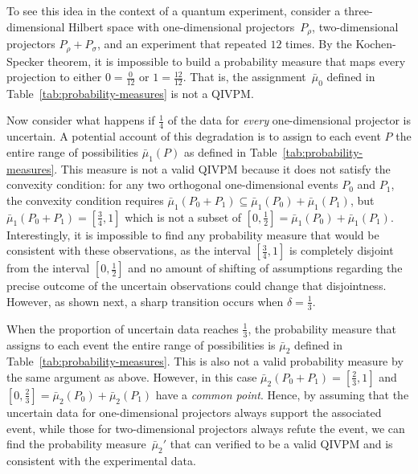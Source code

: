 \documentclass[english,reprint, aps, prl,superscriptaddress, showpacs,
showkeys, longbibliography, amsmath, amssymb, floatfix]{revtex4-1}
\theoremstyle{plain}
\theoremstyle{definition}
\begin{document}
To see this idea in the context of a quantum experiment, consider
a three-dimensional Hilbert space with one-dimensional projectors~$P_{\rho}$,
two-dimensional projectors $P_{\rho}+P_{\sigma}$, and an experiment
that repeated $12$ times. By the Kochen-Specker theorem, it is impossible
to build a probability measure that maps every projection to either
$0=\frac{0}{12}$ or $1=\frac{12}{12}$. That is, the assignment~$\bar{\mu}_{0}$
defined in Table~\ref{tab:probability-measures} is not a QIVPM.

Now consider what happens if $\frac{1}{4}$ of the data for \emph{every}
one-dimensional projector is uncertain. A potential account of this
degradation is to assign to each event $P$ the entire range of possibilities
$\bar{\mu}_{1}(P)$ as defined in Table~\ref{tab:probability-measures}.
This measure is not a valid QIVPM because it does not satisfy
the convexity condition: for any two orthogonal one-dimensional events
$P_{0}$ and $P_{1}$, the convexity condition requires $\bar{\mu}_{1}\left(P_{0}+P_{1}\right)\subseteq\bar{\mu}_{1}\left(P_{0}\right)+\bar{\mu}_{1}\left(P_{1}\right)$,
but $\bar{\mu}_{1}\left(P_{0}+P_{1}\right)=\left[\tfrac{3}{4},1\right]$
which is not a subset of $\left[0,\tfrac{1}{2}\right]=\bar{\mu}_{1}\left(P_{0}\right)+\bar{\mu}_{1}\left(P_{1}\right)$.
Interestingly, it is impossible to find any probability measure that
would be consistent with these observations, as the interval $\left[\tfrac{3}{4},1\right]$
is completely disjoint from the interval $\left[0,\tfrac{1}{2}\right]$
and no amount of shifting of assumptions regarding the precise outcome
of the uncertain observations could change that disjointness. However,
as shown next, a sharp transition occurs when $\delta=\tfrac{1}{3}$.

When the proportion of uncertain data reaches $\frac{1}{3}$, the probability measure
that assigns to each event the entire range of possibilities is
$\bar{\mu}_{2}$ defined in Table~\ref{tab:probability-measures}.
This is also not a valid probability measure by the same
argument as above. However, in this case $\bar{\mu}_{2}\left(P_{0}+P_{1}\right)=\left[\tfrac{2}{3},1\right]$
and $\left[0,\tfrac{2}{3}\right]=\bar{\mu}_{2}\left(P_{0}\right)+\bar{\mu}_{2}\left(P_{1}\right)$
have a \emph{common point}. Hence, by assuming that the uncertain data for
one-dimensional projectors always support the associated event, while
those for two-dimensional projectors always refute the event, we can
find the probability measure~$\bar{\mu}_{2}'$ that can verified to be a
valid QIVPM and is consistent with the experimental data.
\end{document}

